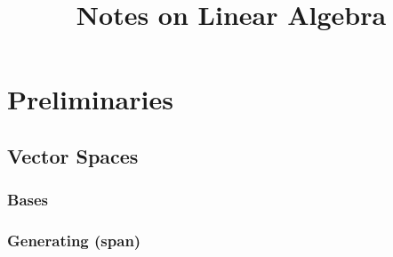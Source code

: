 


\title{Notes on Linear Algebra}

\maketitle

\chapter{Preliminaries}
\section{Vector Spaces}







\newpage
\subsection{Bases}
\subsection{Generating (span)}
